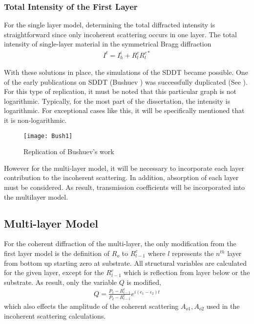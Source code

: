 \subsubsection{Total Intensity of the First Layer}

For the single layer model, determining the total diffracted intensity is straightforward since only incoherent scattering occurs in one layer.  The total intensity of single-layer material in the symmetrical Bragg diffraction
\begin{align}
I^t = I^i_h + R^c_l R_l^{c*}
\end{align}

With these solutions in place, the simulations of the SDDT became possible.  One of the early publications on SDDT (Bushuev \cite{Bushuev1}) was successfully duplicated (See ).  For this type of replication, it must be noted that this particular graph is not logarithmic.  Typically, for the most part of the dissertation, the intensity is logarithmic.   For exceptional cases like this, it will be specifically mentioned that it is non-logarithmic.
\begin{figure}[h]
\centering
\caption{Replication of Bushuev's work \cite{Bushuev1}}
\label{Bush1}
\texttt{[image: Bush1]}
\end{figure}



However for the multi-layer model, it will be necessary to incorporate each layer contribution to the incoherent scattering. In addition, absorption of each layer must be considered.  As result, transmission coefficients will be incorporated into the multilayer model.

		\subsection{Multi-layer Model}

For the coherent diffraction of the multi-layer, the only modification from the first layer model is the definition of $R_o$ to $R^c_{l-1}$ where $l$ represents the $n^{th}$ layer from bottom up starting zero at substrate.  All structural variables are calculated for the given layer, except for the $R^c_{l-1}$ which is reflection from layer below or the substrate.  As result, only the variable $Q$ is modified,
\begin{align}
Q = \frac{P_1 - R^c_{l-1}}{P_2 - R^c_{l-1}}e^{i (\epsilon_1 - \epsilon_2) t}
\end{align}
which also effects the amplitude of the coherent scattering $A_{o1}, A_{o2}$ used in the incoherent scattering calculations.

